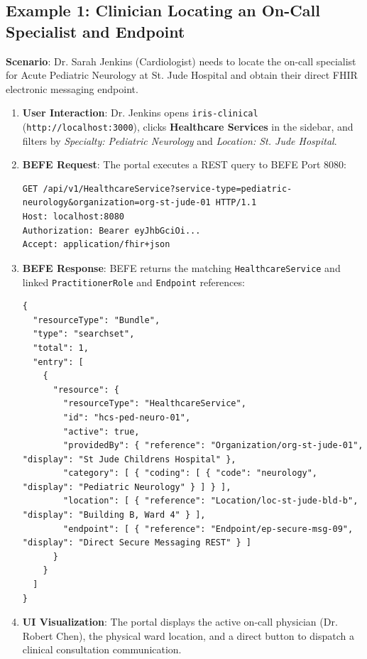 \subsection{Example 1: Clinician Locating an On-Call Specialist and Endpoint}

\textbf{Scenario}: Dr. Sarah Jenkins (Cardiologist) needs to locate the on-call specialist for Acute Pediatric Neurology at St. Jude Hospital and obtain their direct FHIR electronic messaging endpoint.

\begin{enumerate}
    \item \textbf{User Interaction}: Dr. Jenkins opens \texttt{iris-clinical} (\texttt{http://localhost:3000}), clicks \textbf{Healthcare Services} in the sidebar, and filters by \textit{Specialty: Pediatric Neurology} and \textit{Location: St. Jude Hospital}.
    \item \textbf{BEFE Request}: The portal executes a REST query to BEFE Port 8080:
\begin{lstlisting}[caption={HTTP Request to Query Healthcare Services}]
GET /api/v1/HealthcareService?service-type=pediatric-neurology&organization=org-st-jude-01 HTTP/1.1
Host: localhost:8080
Authorization: Bearer eyJhbGciOi...
Accept: application/fhir+json
\end{lstlisting}
    \item \textbf{BEFE Response}: BEFE returns the matching \texttt{HealthcareService} and linked \texttt{PractitionerRole} and \texttt{Endpoint} references:
\begin{lstlisting}[caption={FHIR R5 Bundle Returned by BEFE}]
{
  "resourceType": "Bundle",
  "type": "searchset",
  "total": 1,
  "entry": [
    {
      "resource": {
        "resourceType": "HealthcareService",
        "id": "hcs-ped-neuro-01",
        "active": true,
        "providedBy": { "reference": "Organization/org-st-jude-01", "display": "St Jude Childrens Hospital" },
        "category": [ { "coding": [ { "code": "neurology", "display": "Pediatric Neurology" } ] } ],
        "location": [ { "reference": "Location/loc-st-jude-bld-b", "display": "Building B, Ward 4" } ],
        "endpoint": [ { "reference": "Endpoint/ep-secure-msg-09", "display": "Direct Secure Messaging REST" } ]
      }
    }
  ]
}
\end{lstlisting}
    \item \textbf{UI Visualization}: The portal displays the active on-call physician (Dr. Robert Chen), the physical ward location, and a direct button to dispatch a clinical consultation communication.
\end{enumerate}

